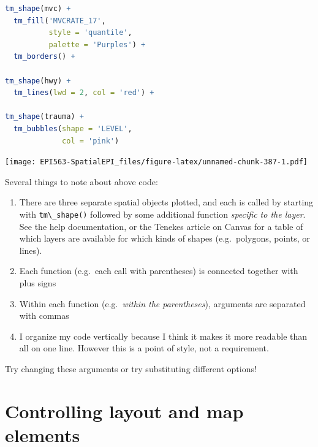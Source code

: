 \documentclass[
]{book}
\newcommand{\passthrough}[1]{#1}
\providecommand{\tightlist}{%
  \setlength{\itemsep}{0pt}\setlength{\parskip}{0pt}}
\begin{document}
\begin{lstlisting}[language=R]
tm_shape(mvc) + 
  tm_fill('MVCRATE_17',
          style = 'quantile',
          palette = 'Purples') +
  tm_borders() +

tm_shape(hwy) + 
  tm_lines(lwd = 2, col = 'red') +
  
tm_shape(trauma) + 
  tm_bubbles(shape = 'LEVEL',
             col = 'pink')
\end{lstlisting}

\texttt{[image: EPI563-SpatialEPI\_files/figure-latex/unnamed-chunk-387-1.pdf]}

Several things to note about above code:

\begin{enumerate}
\def\labelenumi{\arabic{enumi}.}
\tightlist
\item
  There are three separate spatial objects plotted, and each is called by starting with \passthrough{\lstinline!tm\_shape()!} followed by some additional function \emph{specific to the layer}. See the help documentation, or the Tenekes article on Canvas for a table of which layers are available for which kinds of shapes (e.g.~polygons, points, or lines).
\item
  Each function (e.g.~each call with parentheses) is connected together with plus signs
\item
  Within each function (e.g.~\emph{within the parentheses}), arguments are separated with commas
\item
  I organize my code vertically because I think it makes it more readable than all on one line. However this is a point of style, not a requirement.
\end{enumerate}

Try changing these arguments or try substituting different options!

\hypertarget{controlling-layout-and-map-elements}{%
\section{Controlling layout and map elements}\label{controlling-layout-and-map-elements}}
\end{document}
